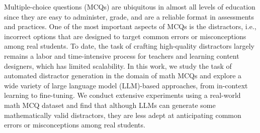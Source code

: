 Multiple-choice questions (MCQs) are ubiquitous in almost all levels of education since they are easy to administer, grade, and are a reliable format in assessments and practices. One of the most important aspects of MCQs is the distractors, i.e., incorrect options that are designed to target common errors or misconceptions among real students. To date, the task of crafting high-quality distractors largely remains a labor and time-intensive process for teachers and learning content designers, which has limited scalability. In this work, we study the task of automated distractor generation in the domain of math MCQs and explore a wide variety of large language model (LLM)-based approaches, from in-context learning to fine-tuning. We conduct extensive experiments using a real-world math MCQ dataset and find that although LLMs can generate some mathematically valid distractors, they are less adept at anticipating common errors or misconceptions among real students.